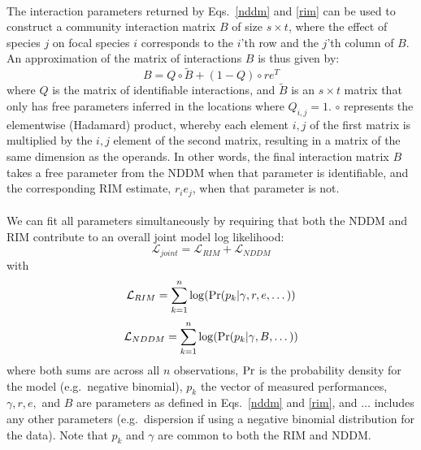 \documentclass[a4,12pt]{article}
\begin{document}
    \paragraph{}
    The interaction parameters returned by Eqs.~\ref{nddm} and \ref{rim} can be used to construct a community interaction matrix $B$ of size $s \times t$, where the effect of species $j$ on focal species $i$ corresponds to the $i$'th row and the $j$'th column of $B$. An approximation of the matrix of interactions $B$ is thus given by:
        \begin{equation}
        B = Q \circ \tilde B + (1 - Q) \circ r e^T
        \label{matB}
        \end{equation}
    where $Q$ is the matrix of identifiable interactions, and $\tilde B$ is an $s \times t$ matrix that only has free parameters inferred in the locations where $Q_{i, j} =1$. $\circ$ represents the elementwise (Hadamard) product, whereby each element $i, j$ of the first matrix is multiplied by the $i, j$ element of the second matrix, resulting in a matrix of the same dimension as the operands. In other words, the final interaction matrix $B$ takes a free parameter from the NDDM when that parameter is identifiable, and the corresponding RIM estimate, $r_i e_j$, when that parameter is not.

    \paragraph{}
    We can fit all parameters simultaneously by requiring that both the NDDM and RIM contribute to an overall joint model log likelihood:
         \begin{equation}
        \mathcal{L}_{joint} = \mathcal{L}_{RIM} + \mathcal{L}_{NDDM}
        \label{loglikjoint}
        \end{equation}
    with
        \begin{equation}
        \mathcal{L}_{RIM} = \sum_{k=1}^{n} \log ({\rm Pr} (p_k | \gamma, r, e, \dots))
        \label{logrim}
        \end{equation}
        \begin{equation}
        \mathcal{L}_{NDDM} = \sum_{k=1}^{n} \log ({\rm Pr} (p_k | \gamma, B, \dots))
        \label{lognddm}
        \end{equation}
    where both sums are across all $n$ observations, ${\rm Pr}$ is the probability density for the model (e.g.\ negative binomial), $p_k$ the vector of measured performances, $\gamma, r, e,$ and $B$ are parameters as defined in Eqs.~\ref{nddm} and \ref{rim}, and $\dots$ includes any other parameters (e.g.\ dispersion if using a negative binomial distribution for the data). Note that $p_k$ and $\gamma$ are common to both the RIM and NDDM.
\end{document}
